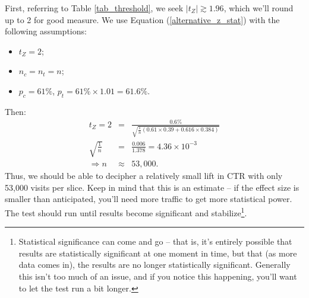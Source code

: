 \documentclass{article}
\numberwithin{equation}{section}
\begin{document}
First, referring to Table \ref{tab_threshold}, we seek $\left| t_Z \right| \gtrsim 1.96$, which we'll round up to 2 for good measure. We use Equation (\ref{alternative_z_stat}) with the following assumptions:
\begin{itemize}
	\item $t_Z = 2$;
	\item $n_c = n_t = n$;
	\item $p_c = 61\%$, $p_t = 61\% \times 1.01 = 61.6\%$.
\end{itemize}
Then:
\begin{eqnarray} \nonumber 
	t_Z = 2 &=& \frac{0.6\%}{\sqrt{\frac{1}{n}\left(0.61 \times 0.39 + 0.616\times 0.384\right)}}  \\ \nonumber
	\sqrt{\frac{1}{n}} &=& \frac{0.006}{1.378} = 4.36 \times 10^{-3} \\
	\Rightarrow n &\approx& 53,000.  
\end{eqnarray}
Thus, we should be able to decipher a relatively small lift in CTR with only 53,000 visits per slice. Keep in mind that this is an estimate -- if the effect size is smaller than anticipated, you'll need more traffic to get more statistical power. The test should run until results become significant and stabilize\footnote{Statistical significance can come and go -- that is, it's entirely possible that results are statistically significant at one moment in time, but that (as more data comes in), the results are no longer statistically significant. Generally this isn't too much of an issue, and if you notice this happening, you'll want to let the test run a bit longer.}.
\end{document}
